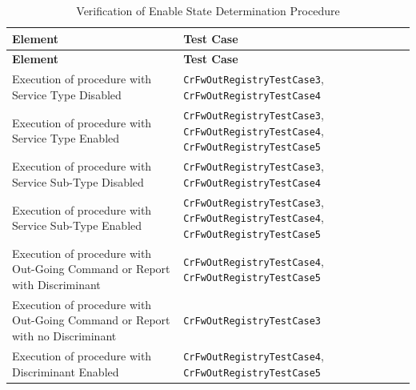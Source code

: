 \documentclass[a4paper,10pt]{article}
\begin{document}
\begin{longtable}{|>{\raggedright}p{6.0cm}|P{5.0cm}|}
\caption{Verification of Enable State Determination Procedure}
\label{tab:verEnableStateDeterminationProc}\\
\hline
{}
\textbf{Element} & \textbf{Test Case} \\
\hline
\endfirsthead
{}
\textbf{Element} & \textbf{Test Case} \\
\hline
\endhead
Execution of procedure with Service Type Disabled & \texttt{CrFwOutRegistryTestCase3}, \texttt{CrFwOutRegistryTestCase4}\\
\hline
Execution of procedure with Service Type Enabled & \texttt{CrFwOutRegistryTestCase3}, \texttt{CrFwOutRegistryTestCase4}, \texttt{CrFwOutRegistryTestCase5}\\
\hline
Execution of procedure with Service Sub-Type Disabled & \texttt{CrFwOutRegistryTestCase3}, \texttt{CrFwOutRegistryTestCase4}\\
\hline
Execution of procedure with Service Sub-Type Enabled & \texttt{CrFwOutRegistryTestCase3}, \texttt{CrFwOutRegistryTestCase4}, \texttt{CrFwOutRegistryTestCase5}\\
\hline
Execution of procedure with Out-Going Command or Report with Discriminant & \texttt{CrFwOutRegistryTestCase4}, \texttt{CrFwOutRegistryTestCase5}\\
\hline
Execution of procedure with Out-Going Command or Report with no Discriminant & \texttt{CrFwOutRegistryTestCase3}\\
\hline
Execution of procedure with Discriminant Enabled & \texttt{CrFwOutRegistryTestCase4}, \texttt{CrFwOutRegistryTestCase5}\\
\hline
\end{longtable}
\end{document}
